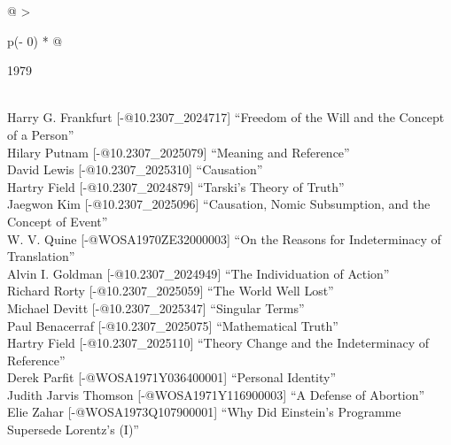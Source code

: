 \documentclass[
  10pt,
  letterpaper,
  DIV=11,
  numbers=noendperiod,
  twoside]{scrartcl}
\begin{document}
\begin{longtable}[]{@{}
  >{\raggedright\arraybackslash}p{(\columnwidth - 0\tabcolsep) * }@{}}

\caption{\label{tbl-top-ten-1970}Most cited articles published less than
ten years ago as of 1979.}

\tabularnewline

\toprule\noalign{}
\begin{minipage}[b]{\linewidth}\raggedright
1979
\end{minipage} \\
\midrule\noalign{}
\endhead
\bottomrule\noalign{}
\endlastfoot
Harry G. Frankfurt {[}-@10.2307\_2024717{]} ``Freedom of the Will and
the Concept of a Person'' \\
Hilary Putnam {[}-@10.2307\_2025079{]} ``Meaning and Reference'' \\
David Lewis {[}-@10.2307\_2025310{]} ``Causation'' \\
Hartry Field {[}-@10.2307\_2024879{]} ``Tarski's Theory of Truth'' \\
Jaegwon Kim {[}-@10.2307\_2025096{]} ``Causation, Nomic Subsumption, and
the Concept of Event'' \\
W. V. Quine {[}-@WOSA1970ZE32000003{]} ``On the Reasons for
Indeterminacy of Translation'' \\
Alvin I. Goldman {[}-@10.2307\_2024949{]} ``The Individuation of
Action'' \\
Richard Rorty {[}-@10.2307\_2025059{]} ``The World Well Lost'' \\
Michael Devitt {[}-@10.2307\_2025347{]} ``Singular Terms'' \\
Paul Benacerraf {[}-@10.2307\_2025075{]} ``Mathematical Truth'' \\
Hartry Field {[}-@10.2307\_2025110{]} ``Theory Change and the
Indeterminacy of Reference'' \\
Derek Parfit {[}-@WOSA1971Y036400001{]} ``Personal Identity'' \\
Judith Jarvis Thomson {[}-@WOSA1971Y116900003{]} ``A Defense of
Abortion'' \\
Elie Zahar {[}-@WOSA1973Q107900001{]} ``Why Did Einstein's Programme
Supersede Lorentz's (I)'' \\

\end{longtable}
\end{document}
